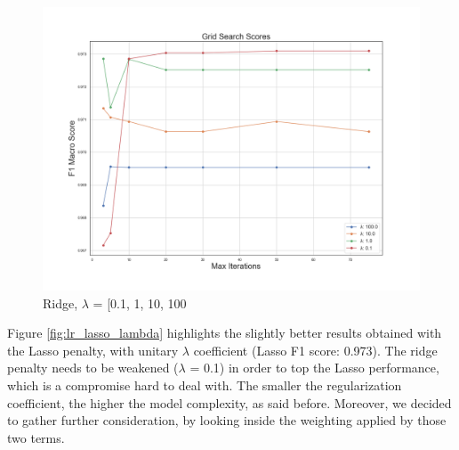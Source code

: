 \begin{figure}
	\includegraphics[width=\columnwidth]{chapter5/figure/logreg_l2_lambda.png}\par 
	\caption{Ridge, $ \lambda$ = [0.1, 1, 10, 100}
	\label{fig:lr_ridge_lambda}
\end{figure}

Figure \ref{fig:lr_lasso_lambda} highlights the slightly better results obtained with the Lasso penalty, with unitary $ \lambda $ coefficient (Lasso F1 score: 0.973).
The ridge penalty needs to be weakened ($ \lambda $ = 0.1) in order to top the Lasso performance, which is a compromise hard to deal with. The smaller the regularization coefficient, the higher the model complexity, as said before.
Moreover, we decided to gather further consideration, by looking inside the weighting applied by those two terms.

